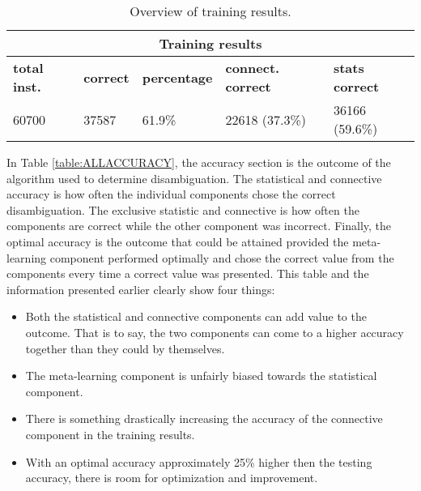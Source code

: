 \begin{table}[htp]
	\centering 
	\begin{tabular}{|l|l|l|l|l|}
		\hline
			\multicolumn{5}{|c|}{\bf Training results } \\
		\hline
		{\bf total inst.} & {\bf correct } & {\bf percentage} & {\bf connect. correct } & {\bf stats correct } \\ \hline 
		60700				  & 37587		   & 61.9\%		  & 22618 (37.3\%)				  & 36166 (59.6\%)   \\ \hline 
	\end{tabular}
	\caption{Overview of training results. \label{table:TRAININGRESULTS}}
\end{table}

In Table \ref{table:ALLACCURACY}, the accuracy section is the outcome of the
algorithm used to determine disambiguation. The statistical and connective
accuracy is how often the individual components chose the correct
disambiguation.  The exclusive statistic and connective is how often the
components are correct while the other component was incorrect.  Finally, the
optimal accuracy is the outcome that could be attained provided the meta-learning component performed optimally and chose the correct value from the
components every time a correct value was presented. This table and the
information presented earlier clearly show four things: 
\begin{itemize}
	\item Both the statistical and connective components can add value to the 
	outcome. That is to say, the two components can come to a higher accuracy 
	together than they could by themselves.     
	\item The meta-learning component is unfairly biased towards the statistical
	component.     
	\item There is something drastically increasing the accuracy of the connective component in the training results.
	\item With an optimal accuracy approximately 25\% higher then the testing accuracy, there is room for optimization and improvement. 
\end{itemize}


